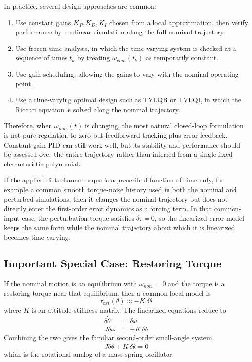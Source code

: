\documentclass[11pt]{article}
\begin{document}
In practice, several design approaches are common:
\begin{enumerate}
    \item Use constant gains $K_{P}, K_{D}, K_{I}$ chosen from a local approximation, then verify performance by nonlinear simulation along the full nominal trajectory.
    \item Use frozen-time analysis, in which the time-varying system is checked at a sequence of times $t_{k}$ by treating $\omega_{nom}(t_{k})$ as temporarily constant.
    \item Use gain scheduling, allowing the gains to vary with the nominal operating point.
    \item Use a time-varying optimal design such as TVLQR or TVLQI, in which the Riccati equation is solved along the nominal trajectory.
\end{enumerate}

Therefore, when $\omega_{nom}(t)$ is changing, the most natural closed-loop formulation is not pure regulation to zero but feedforward tracking plus error feedback. Constant-gain PID can still work well, but its stability and performance should be assessed over the entire trajectory rather than inferred from a single fixed characteristic polynomial.

If the applied disturbance torque is a prescribed function of time only, for example a common smooth torque-noise history used in both the nominal and perturbed simulations, then it changes the nominal trajectory but does not directly enter the first-order error dynamics as a forcing term. In that common-input case, the perturbation torque satisfies $\delta\tau = 0$, so the linearized error model keeps the same form while the nominal trajectory about which it is linearized becomes time-varying.

\subsection{Important Special Case: Restoring Torque}
If the nominal motion is an equilibrium with $\omega_{nom} = 0$ and the torque is a restoring torque near that equilibrium, then a common local model is
\begin{equation}
    \tau_{ext}(\theta) \approx -K \, \delta\theta
\end{equation}
where $K$ is an attitude stiffness matrix. The linearized equations reduce to
\begin{align}
    \delta\dot{\theta} &= \delta\omega \\
    J\delta\dot{\omega} &= -K \, \delta\theta
\end{align}
Combining the two gives the familiar second-order small-angle system
\begin{equation}
    J \delta\ddot{\theta} + K \, \delta\theta = 0
\end{equation}
which is the rotational analog of a mass-spring oscillator.
\end{document}
